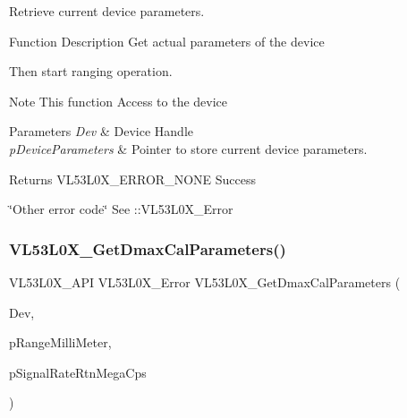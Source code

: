 Retrieve current device parameters. 

\begin{DoxyParagraph}{Function Description}
Get actual parameters of the device \begin{DoxyItemize}
\item Then start ranging operation.\end{DoxyItemize}

\end{DoxyParagraph}
\begin{DoxyNote}{Note}
This function Access to the device
\end{DoxyNote}

\begin{DoxyParams}{Parameters}
{\em Dev} & Device Handle \\
\hline
{\em p\+Device\+Parameters} & Pointer to store current device parameters. \\
\hline
\end{DoxyParams}
\begin{DoxyReturn}{Returns}
V\+L53\+L0\+X\+\_\+\+E\+R\+R\+O\+R\+\_\+\+N\+O\+NE Success 

\char`\"{}\+Other error code\char`\"{} See \+::\+V\+L53\+L0\+X\+\_\+\+Error 
\end{DoxyReturn}
\mbox{\label{group__VL53L0X__parameters__group_ga8e3f50afe785be486061bc30eb86129e}} 
\subsubsection{\texorpdfstring{V\+L53\+L0\+X\+\_\+\+Get\+Dmax\+Cal\+Parameters()}{VL53L0X\_GetDmaxCalParameters()}}
{\footnotesize\ttfamily V\+L53\+L0\+X\+\_\+\+A\+PI V\+L53\+L0\+X\+\_\+\+Error V\+L53\+L0\+X\+\_\+\+Get\+Dmax\+Cal\+Parameters (\begin{DoxyParamCaption}\item[{\hyperlink{group__VL53L0X__platform__group_ga2d6405308b1dd524b462f1b8fb97d167}{V\+L53\+L0\+X\+\_\+\+D\+EV}}]{Dev,  }\item[{\hyperlink{vl53l0x__types_8h_a273cf69d639a59973b6019625df33e30}{uint16\+\_\+t} $\ast$}]{p\+Range\+Milli\+Meter,  }\item[{\hyperlink{vl53l0x__types_8h_afb910790161809fc76e1a274a6349384}{Fix\+Point1616\+\_\+t} $\ast$}]{p\+Signal\+Rate\+Rtn\+Mega\+Cps }\end{DoxyParamCaption})}



